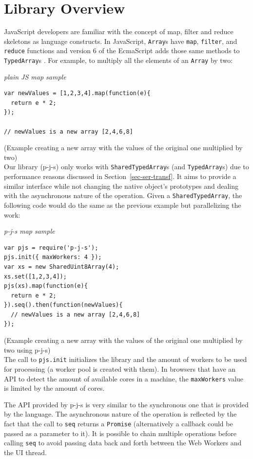 \documentclass[runningheads,a4paper]{llncs}
\begin{document}
\section{Library Overview}\label{sec-overview}
JavaScript developers are familiar with the concept of map, filter and reduce skeletons as language constructs. In JavaScript, \verb+Array+s have \verb+map+, \verb+filter+, and \verb+reduce+ functions and version 6 of the EcmaScript adds those same methods to \verb+TypedArray+s \cite{es6-ta}. For example, to multiply all the elements of an \verb+Array+ by two:
\medskip

\noindent
{\it plain JS map sample}
\begin{verbatim}
var newValues = [1,2,3,4].map(function(e){
  return e * 2;
});

// newValues is a new array [2,4,6,8]
\end{verbatim}
%
\noindent
{\small (Example creating a new array with the values of the original one multiplied by two)}\\

Our library (p-j-s) only works with \verb+SharedTypedArray+s (and \verb+TypedArray+s) due to performance reasons discussed in Section~\ref{sec-ser-transf}. It aims to provide a similar interface while not changing the native object's prototypes and dealing with the asynchronous nature of the operation. Given a \verb+SharedTypedArray+, the following code would do the same as the previous example but parallelizing the work:
\medskip

\noindent
{\it p-j-s map sample}
\begin{verbatim}
var pjs = require('p-j-s');
pjs.init({ maxWorkers: 4 });
var xs = new SharedUint8Array(4);
xs.set([1,2,3,4]);
pjs(xs).map(function(e){
  return e * 2;
}).seq().then(function(newValues){
  // newValues is a new array [2,4,6,8]
});
\end{verbatim}
%
\noindent
{\small (Example creating a new array with the values of the original one multiplied by two using p-j-s)}\\

The call to \verb+pjs.init+ initializes the library and the amount of workers to be used for processing (a worker pool is created with them). In browsers that have an API to detect the amount of available cores in a machine, the \verb+maxWorkers+ value is limited by the amount of cores.

The API provided by p-j-s \cite{pjs-api} is very similar to the synchronous one that is provided by the language. The asynchronous nature of the operation is reflected by the fact that the call to \verb+seq+ returns a \verb+Promise+ (alternatively a callback could be passed as a parameter to it). It is possible to chain multiple operations before calling \verb+seq+ to avoid passing data back and forth between the Web Workers and the UI thread.
\end{document}
